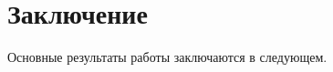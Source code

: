 \chapter*{Заключение}                       %


Основные результаты работы заключаются в следующем.

